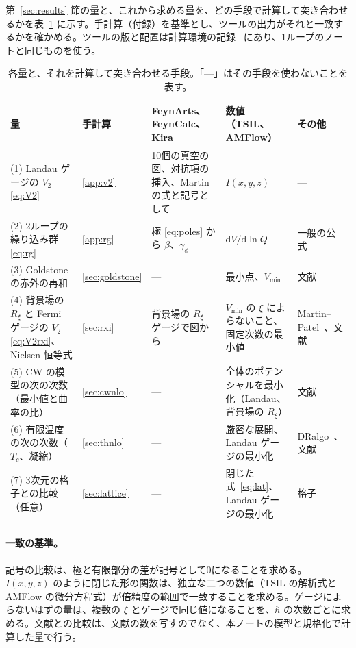 \documentclass[a4paper,10pt]{ltjsarticle}
\newcommand{\dd}{\mathrm{d}}
\begin{document}
第~\ref{sec:results} 節の量と、これから求める量を、どの手段で計算して突き合わせるかを表~\ref{tab:plan} に示す。手計算（付録）を基準とし、ツールの出力がそれと一致するかを確かめる。ツールの版と配置は計算環境の記録~\cite{env} にあり、1ループのノートと同じものを使う。

\begin{table}[tbp]
\centering\small
\caption{各量と、それを計算して突き合わせる手段。「—」はその手段を使わないことを表す。}
\label{tab:plan}
\begin{tabularx}{\linewidth}{>{\raggedright\arraybackslash}p{3.3cm}>{\raggedright\arraybackslash}p{1.3cm}>{\raggedright\arraybackslash}X>{\raggedright\arraybackslash}p{2.6cm}>{\raggedright\arraybackslash}p{2.4cm}}
\toprule
\textbf{量} & \textbf{手計算} & \textbf{FeynArts、FeynCalc、Kira} & \textbf{数値（TSIL、AMFlow）} & \textbf{その他} \\
\midrule
(1) Landau ゲージの $V_2$ \eqref{eq:V2} & \ref{app:v2} & 10個の真空の図、対抗項の挿入、Martin の式と記号として & $I(x,y,z)$ & — \\
(2) 2ループの繰り込み群 \eqref{eq:rg} & \ref{app:rg} & 極 \eqref{eq:poles} から $\beta$、$\gamma_\phi$ & $\dd V/\dd\ln Q$ & 一般の公式~\cite{mv83,lwx03} \\
(3) Goldstone の赤外の再和 & \ref{sec:goldstone} & — & 最小点、$V_{\min}$ & 文献~\cite{martin14,eek14,pr11} \\
(4) 背景場の $R_\xi$ と Fermi ゲージの $V_2$ \eqref{eq:V2rxi}、Nielsen 恒等式 & \ref{sec:rxi} & 背景場の $R_\xi$ ゲージで図から & $V_{\min}$ の $\xi$ によらないこと、固定次数の最小値 & Martin--Patel~\cite{mp18}、文献~\cite{egk16} \\
(5) CW の模型の次の次数（最小値と曲率の比） & \ref{sec:cwnlo} & — & 全体のポテンシャルを最小化（Landau、背景場の $R_\xi$） & 文献~\cite{afs15,egk16} \\
(6) 有限温度の次の次数（$T_c$、凝縮） & \ref{sec:thnlo} & — & 厳密な展開、Landau ゲージの最小化 & DRalgo~\cite{dralgo}、文献~\cite{kklp98,hlrst22} \\
(7) 3次元の格子との比較（任意） & \ref{sec:lattice} & — & 閉じた式~\eqref{eq:lat}、Landau ゲージの最小化 & 格子~\cite{kklp98} \\
\bottomrule
\end{tabularx}
\end{table}

\paragraph{一致の基準。}記号の比較は、極と有限部分の差が記号として0になることを求める。$I(x,y,z)$ のように閉じた形の関数は、独立な二つの数値（TSIL の解析式と AMFlow の微分方程式）が倍精度の範囲で一致することを求める。ゲージによらないはずの量は、複数の $\xi$ とゲージで同じ値になることを、$\hbar$ の次数ごとに求める。文献との比較は、文献の数を写すのでなく、本ノートの模型と規格化で計算した量で行う。
\end{document}
